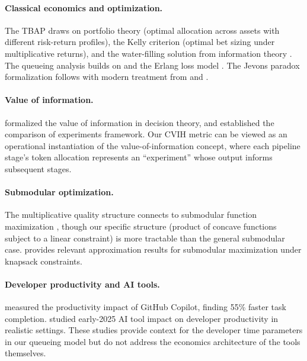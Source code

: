 \documentclass[11pt, a4paper, copyright]{googledeepmind}
\begin{document}
\paragraph{Classical economics and optimization.}
The TBAP draws on portfolio theory \citep{markowitz1952} (optimal allocation across assets with different risk-return profiles), the Kelly criterion \citep{kelly1956} (optimal bet sizing under multiplicative returns), and the water-filling solution from information theory \citep{cover2006}. The queueing analysis builds on \citet{kleinrock1975, kleinrock1976} and the Erlang loss model \citep{erlang1917}. The Jevons paradox formalization follows \citet{jevons1865} with modern treatment from \citet{sorrell2009} and \citet{alcott2005}.

\paragraph{Value of information.}
\citet{howard1966} formalized the value of information in decision theory, and \citet{blackwell1953} established the comparison of experiments framework. Our CVIH metric can be viewed as an operational instantiation of the value-of-information concept, where each pipeline stage's token allocation represents an ``experiment'' whose output informs subsequent stages.

\paragraph{Submodular optimization.}
The multiplicative quality structure connects to submodular function maximization \citep{nemhauser1978, krause2014, buchbinder2015, feige2011}, though our specific structure (product of concave functions subject to a linear constraint) is more tractable than the general submodular case. \citet{sviridenko2004} provides relevant approximation results for submodular maximization under knapsack constraints.

\paragraph{Developer productivity and AI tools.}
\citet{peng2023impact} measured the productivity impact of GitHub Copilot, finding 55\% faster task completion. \citet{metr2025} studied early-2025 AI tool impact on developer productivity in realistic settings. These studies provide context for the developer time parameters in our queueing model but do not address the economics architecture of the tools themselves.
\end{document}
